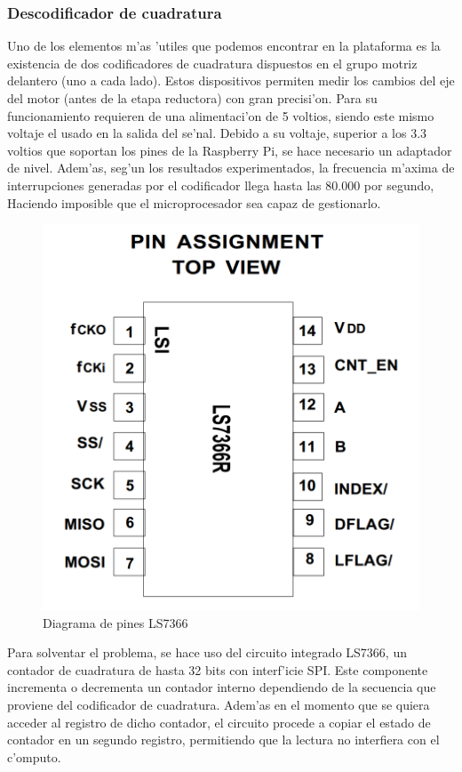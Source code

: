 \documentclass[twoside,12pt]{article}
\begin{document}
\subsubsection{Descodificador de cuadratura} \label{sec:LS7366}
Uno de los elementos m'as 'utiles que podemos encontrar en la plataforma es la existencia de dos codificadores de cuadratura dispuestos en el grupo motriz delantero (uno a cada lado). Estos dispositivos permiten medir los cambios del eje del motor (antes de la etapa reductora) con gran precisi'on. Para su funcionamiento requieren de una alimentaci'on de 5 voltios, siendo este mismo voltaje el usado en la salida del se'nal. Debido a su voltaje, superior a los 3.3 voltios que soportan los pines de la Raspberry Pi, se hace necesario un adaptador de nivel. Adem'as, seg'un los resultados experimentados, la frecuencia m'axima de interrupciones generadas por el codificador llega hasta las 80.000 por segundo, Haciendo imposible que el microprocesador sea capaz de gestionarlo.

\begin{figure}[ht]
\centering
\includegraphics[scale=0.15]{images/LS7366.png} 
\caption{Diagrama de pines LS7366}
\label{fig:LS7366}
\end{figure} 

Para solventar el problema, se hace uso del circuito integrado LS7366, un contador de cuadratura de hasta 32 bits con interf'icie SPI. Este componente incrementa o decrementa un contador interno dependiendo de la secuencia que proviene del codificador de cuadratura. Adem'as en el momento que se quiera acceder al registro de dicho contador, el circuito procede a copiar el estado de contador en un segundo registro, permitiendo que la lectura no interfiera con el c'omputo.\\
\end{document}

